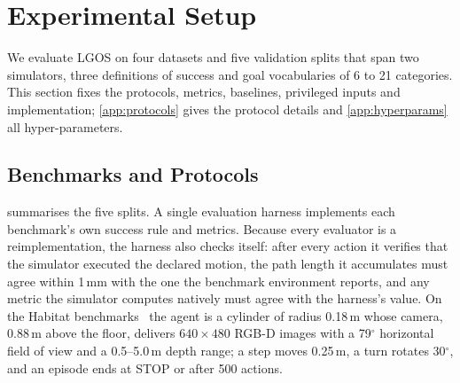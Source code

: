 \documentclass[10pt]{article}
\newcommand{\ours}{LGOS\xspace}
\begin{document}
\section{Experimental Setup}\label{sec:experiments}

We evaluate \ours on four datasets and five validation splits that span two simulators, three definitions of
success and goal vocabularies of 6 to 21 categories. This section fixes the protocols, metrics, baselines,
privileged inputs and implementation; \cref{app:protocols} gives the protocol details and \cref{app:hyperparams}
all hyper-parameters.

\subsection{Benchmarks and Protocols}\label{sec:experiments-benchmarks}

 summarises the five splits. A single evaluation harness implements each benchmark's own
success rule and metrics. Because every evaluator is a reimplementation, the harness also checks itself: after every
action it verifies that the simulator executed the declared motion, the path length it accumulates must agree within
1\,mm with the one the benchmark environment reports, and any metric the simulator computes natively must agree with
the harness's value. On the Habitat benchmarks~\citep{savva2019habitat} the agent is a cylinder of radius 0.18\,m
whose camera, 0.88\,m above the floor, delivers $640\times480$ RGB-D images with a 79$^\circ$ horizontal field of
view and a 0.5--5.0\,m depth range; a step moves 0.25\,m, a turn rotates 30$^\circ$, and an episode ends at STOP or
after 500 actions.
\end{document}
